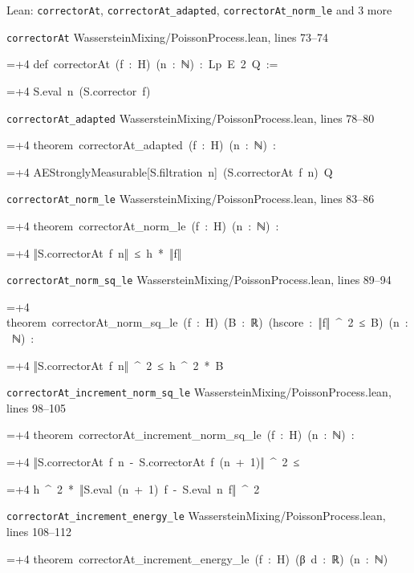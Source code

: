 \documentclass[11pt,a4paper]{article}
\newlength{\leancharwidth}
\newenvironment{leancode}{\par\smallskip\begingroup\ttfamily\footnotesize\raggedright
  \settowidth{\leancharwidth}{M}\setlength{\parskip}{0pt}\setlength{\parindent}{0pt}
  \frenchspacing}{\par\endgroup\smallskip}
\newcommand{\leanline}[2]{\hangindent=\dimexpr#1\leancharwidth+4\leancharwidth\relax
  \hangafter=1\noindent\hspace*{#1\leancharwidth}#2\par}
\newcommand{\leansource}[1]{\par{\footnotesize\color{leanmuted}#1}\par}
\begin{document}
\begin{leanbox}{Lean: \texttt{correctorAt}, \texttt{correctorAt\_\allowbreak{}adapted}, \texttt{correctorAt\_\allowbreak{}norm\_\allowbreak{}le} and 3 more}
\leansource{\texttt{correctorAt} \quad WassersteinMixing/\allowbreak{}PoissonProcess.lean, lines 73–74}
\begin{leancode}
\leanline{0}{def\ correctorAt\ (f\ :\ H)\ (n\ :\ ℕ)\ :\ Lp\ E\ 2\ Q\ :=}
\leanline{2}{S.eval\ n\ (S.corrector\ f)}
\end{leancode}
\leansource{\texttt{correctorAt\_\allowbreak{}adapted} \quad WassersteinMixing/\allowbreak{}PoissonProcess.lean, lines 78–80}
\begin{leancode}
\leanline{0}{theorem\ correctorAt\_adapted\ (f\ :\ H)\ (n\ :\ ℕ)\ :}
\leanline{4}{AEStronglyMeasurable[S.filtration\ n]\ (S.correctorAt\ f\ n)\ Q}
\end{leancode}
\leansource{\texttt{correctorAt\_\allowbreak{}norm\_\allowbreak{}le} \quad WassersteinMixing/\allowbreak{}PoissonProcess.lean, lines 83–86}
\begin{leancode}
\leanline{0}{theorem\ correctorAt\_norm\_le\ (f\ :\ H)\ (n\ :\ ℕ)\ :}
\leanline{4}{‖S.correctorAt\ f\ n‖\ ≤\ h\ *\ ‖f‖}
\end{leancode}
\leansource{\texttt{correctorAt\_\allowbreak{}norm\_\allowbreak{}sq\_\allowbreak{}le} \quad WassersteinMixing/\allowbreak{}PoissonProcess.lean, lines 89–94}
\begin{leancode}
\leanline{0}{theorem\ correctorAt\_norm\_sq\_le\ (f\ :\ H)\ (B\ :\ ℝ)\ (hscore\ :\ ‖f‖\ \textasciicircum{}\ 2\ ≤\ B)\ (n\ :\ ℕ)\ :}
\leanline{4}{‖S.correctorAt\ f\ n‖\ \textasciicircum{}\ 2\ ≤\ h\ \textasciicircum{}\ 2\ *\ B}
\end{leancode}
\leansource{\texttt{correctorAt\_\allowbreak{}increment\_\allowbreak{}norm\_\allowbreak{}sq\_\allowbreak{}le} \quad WassersteinMixing/\allowbreak{}PoissonProcess.lean, lines 98–105}
\begin{leancode}
\leanline{0}{theorem\ correctorAt\_increment\_norm\_sq\_le\ (f\ :\ H)\ (n\ :\ ℕ)\ :}
\leanline{4}{‖S.correctorAt\ f\ n\ -\ S.correctorAt\ f\ (n\ +\ 1)‖\ \textasciicircum{}\ 2\ ≤}
\leanline{6}{h\ \textasciicircum{}\ 2\ *\ ‖S.eval\ (n\ +\ 1)\ f\ -\ S.eval\ n\ f‖\ \textasciicircum{}\ 2}
\end{leancode}
\leansource{\texttt{correctorAt\_\allowbreak{}increment\_\allowbreak{}energy\_\allowbreak{}le} \quad WassersteinMixing/\allowbreak{}PoissonProcess.lean, lines 108–112}
\begin{leancode}
\leanline{0}{theorem\ correctorAt\_increment\_energy\_le\ (f\ :\ H)\ (β\ d\ :\ ℝ)\ (n\ :\ ℕ)}

\end{leancode}
\end{leanbox}
\end{document}
